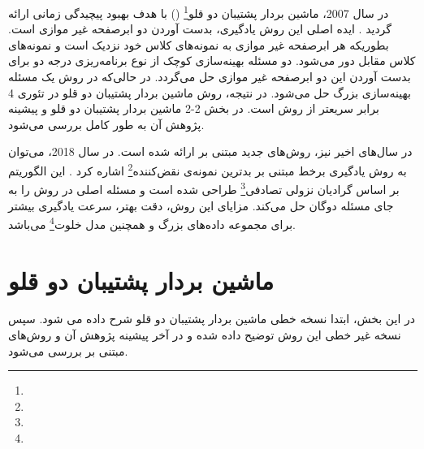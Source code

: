 در سال 2007، ماشین بردار پشتیبان دو قلو\footnote{}  () با هدف بهبود پیچیدگی زمانی  ارائه گردید \cite{jayadeva2007}. ایده اصلی این روش یادگیری، بدست آوردن دو ابرصفحه غیر موازی است. بطوریکه هر ابرصفحه غیر موازی به نمونه‌های کلاس خود نزدیک است و نمونه‌های کلاس مقابل دور می‌شود. دو مسئله بهینه‌سازی کوچک از نوع برنامه‌ریزی درجه دو برای بدست آوردن این دو ابرصفحه غیر موازی حل می‌گردد. در حالی‌که در روش  یک مسئله بهینه‌سازی بزرگ حل می‌شود. در نتیجه، روش ماشین بردار پشتیبان دو قلو در تئوری 4 برابر سریعتر از روش  است. در بخش ‏2-2 ماشین بردار پشتیبان دو قلو و پیشینه پژوهش آن به طور کامل بررسی می‌شود.

در سال‌های اخیر نیز، روش‌های جدید مبتنی بر  ارائه شده است. در سال 2018، می‌توان به روش یادگیری برخط مبتنی بر بدترین نمونه‌ی نقض‌کننده\footnote{}  اشاره کرد \cite{melki2018}. این الگوریتم بر اساس گرادیان نزولی تصادفی\footnote{}  طراحی شده است و مسئله اصلی در روش  را به جای مسئله دوگان حل می‌کند. مزایای این روش، دقت بهتر، سرعت یادگیری بیشتر برای مجموعه داده‌های بزرگ و همچنین مدل خلوت\footnote{}  می‌باشد.

\section{ماشین بردار پشتیبان دو قلو}\label{sec:2:2}
در این بخش، ابتدا نسخه خطی ماشین بردار پشتیبان دو قلو شرح داده می شود. سپس نسخه غیر خطی این روش توضیح داده شده و در آخر پیشینه پژوهش آن و روش‌های مبتنی بر  بررسی می‌شود.

